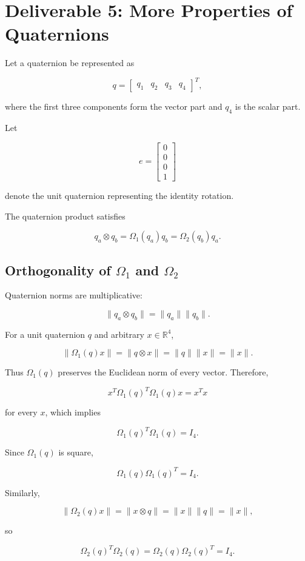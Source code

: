 \documentclass[11pt,a4paper]{article}
\begin{document}
\section{Deliverable 5: More Properties of Quaternions}

Let a quaternion be represented as

\[
q =
\begin{bmatrix}
q_1&q_2&q_3&q_4
\end{bmatrix}^T,
\]

where the first three components form the vector part and $q_4$ is the
scalar part.

Let

\[
e =
\begin{bmatrix}
0\\0\\0\\1
\end{bmatrix}
\]

denote the unit quaternion representing the identity rotation.

The quaternion product satisfies

\[
q_a \otimes q_b
=
\Omega_1(q_a)q_b
=
\Omega_2(q_b)q_a.
\]

\subsection{Orthogonality of $\Omega_1$ and $\Omega_2$}

Quaternion norms are multiplicative:

\[
\|q_a\otimes q_b\|
=
\|q_a\|\|q_b\|.
\]

For a unit quaternion $q$ and arbitrary $x\in\mathbb{R}^4$,

\[
\|\Omega_1(q)x\|
=
\|q\otimes x\|
=
\|q\|\|x\|
=
\|x\|.
\]

Thus $\Omega_1(q)$ preserves the Euclidean norm of every vector.
Therefore,

\[
x^T\Omega_1(q)^T\Omega_1(q)x
=
x^Tx
\]

for every $x$, which implies

\[
\boxed{
\Omega_1(q)^T\Omega_1(q)=I_4
}.
\]

Since $\Omega_1(q)$ is square,

\[
\boxed{
\Omega_1(q)\Omega_1(q)^T=I_4
}.
\]

Similarly,

\[
\|\Omega_2(q)x\|
=
\|x\otimes q\|
=
\|x\|\|q\|
=
\|x\|,
\]

so

\[
\boxed{
\Omega_2(q)^T\Omega_2(q)
=
\Omega_2(q)\Omega_2(q)^T
=
I_4
}.
\]
\end{document}
